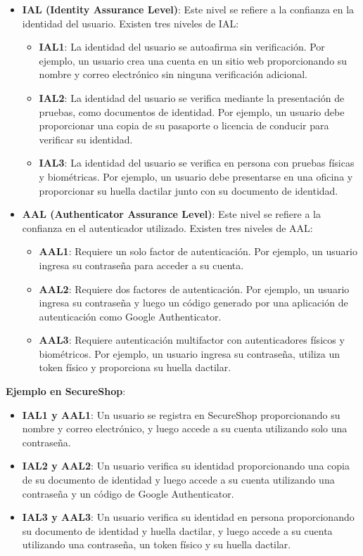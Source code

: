 \begin{itemize}
    \item \textbf{IAL (Identity Assurance Level)}: Este nivel se refiere a la confianza en la identidad del usuario. Existen tres niveles de IAL:
    \begin{itemize}
        \item \textbf{IAL1}: La identidad del usuario se autoafirma sin verificación. Por ejemplo, un usuario crea una cuenta en un sitio web proporcionando su nombre y correo electrónico sin ninguna verificación adicional.
        \item \textbf{IAL2}: La identidad del usuario se verifica mediante la presentación de pruebas, como documentos de identidad. Por ejemplo, un usuario debe proporcionar una copia de su pasaporte o licencia de conducir para verificar su identidad.
        \item \textbf{IAL3}: La identidad del usuario se verifica en persona con pruebas físicas y biométricas. Por ejemplo, un usuario debe presentarse en una oficina y proporcionar su huella dactilar junto con su documento de identidad.
    \end{itemize}
    \item \textbf{AAL (Authenticator Assurance Level)}: Este nivel se refiere a la confianza en el autenticador utilizado. Existen tres niveles de AAL:
    \begin{itemize}
        \item \textbf{AAL1}: Requiere un solo factor de autenticación. Por ejemplo, un usuario ingresa su contraseña para acceder a su cuenta.
        \item \textbf{AAL2}: Requiere dos factores de autenticación. Por ejemplo, un usuario ingresa su contraseña y luego un código generado por una aplicación de autenticación como Google Authenticator.
        \item \textbf{AAL3}: Requiere autenticación multifactor con autenticadores físicos y biométricos. Por ejemplo, un usuario ingresa su contraseña, utiliza un token físico y proporciona su huella dactilar.
    \end{itemize}
\end{itemize}

\textbf{Ejemplo en SecureShop}:
\begin{itemize}
    \item \textbf{IAL1 y AAL1}: Un usuario se registra en SecureShop proporcionando su nombre y correo electrónico, y luego accede a su cuenta utilizando solo una contraseña.
    \item \textbf{IAL2 y AAL2}: Un usuario verifica su identidad proporcionando una copia de su documento de identidad y luego accede a su cuenta utilizando una contraseña y un código de Google Authenticator.
    \item \textbf{IAL3 y AAL3}: Un usuario verifica su identidad en persona proporcionando su documento de identidad y huella dactilar, y luego accede a su cuenta utilizando una contraseña, un token físico y su huella dactilar.
\end{itemize}

